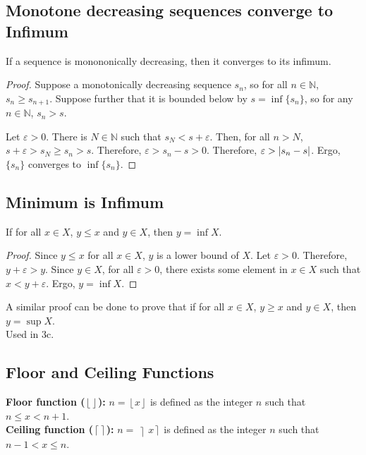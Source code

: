 \documentclass[11pt]{article}
\begin{document}
    \subsection{Monotone decreasing sequences converge to Infimum}
        If a sequence is monononically decreasing, then it converges to its infimum.
        \begin{proof}
            Suppose a monotonically decreasing sequence $s_n$, so for all $n \in \mathbb{N}$, $s_n \geq s_{n + 1}$.
            Suppose further that it is bounded below by $s = \inf\{s_n\}$, so for any $n \in \mathbb{N}$, $s_n > s$.

            Let $\varepsilon > 0$.
            There is $N \in \mathbb{N}$ such that $s_N < s + \varepsilon$.
            Then, for all $n > N$, $s + \varepsilon > s_N \geq s_n > s$.
            Therefore, $\varepsilon > s_n - s > 0$.
            Therefore, $\varepsilon > \left| s_n - s \right|$.
            Ergo, $\{s_n\}$ converges to $\inf\{s_n\}$.
        \end{proof}

    \subsection{Minimum is Infimum}
        If for all $x \in X$, $y \leq x$ and $y \in X$, then $y = \inf X$.
        \begin{proof}
            Since $y \leq x$ for all $x \in X$, $y$ is a lower bound of $X$.
            Let $\varepsilon > 0$.
            Therefore, $y + \varepsilon > y$.
            Since $y \in X$, for all $\varepsilon > 0$, there exists some element in $x \in X$ such that $x < y + \varepsilon$.
            Ergo, $y = \inf X$.
        \end{proof}
        A similar proof can be done to prove that if for all $x \in X$, $y \geq x$ and $y \in X$, then $y = \sup X$.\\
        Used in 3c.
    
    \subsection{Floor and Ceiling Functions}
        \textbf{Floor function ($\left\lfloor \right\rfloor$):}
            $n = \left\lfloor x \right\rfloor$ is defined as the integer $n$ such that $n \leq x < n + 1$.\\
        \textbf{Ceiling function ($\left\lceil \right\rceil$):}
            $n = \left\rceil x \right\rceil$ is defined as the integer $n$ such that $n - 1 < x \leq n$.
\end{document}
